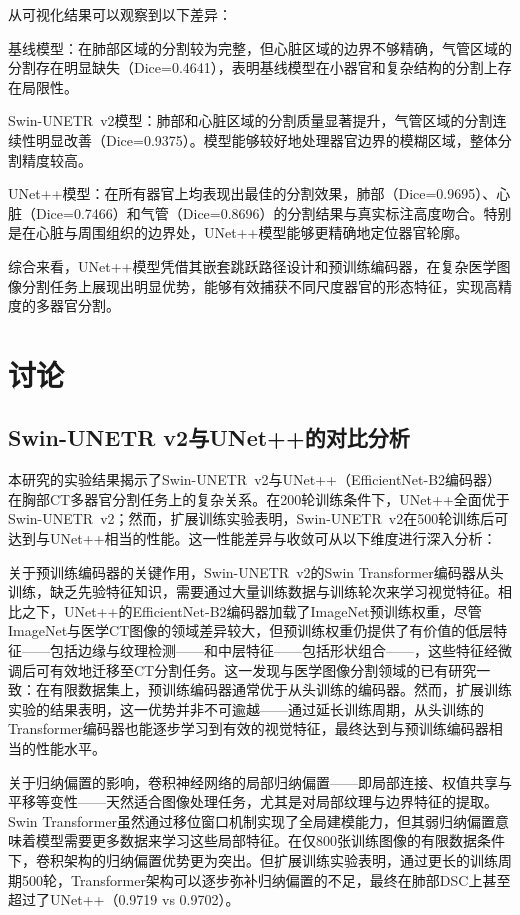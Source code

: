 \documentclass[12pt, a4paper]{article}
\begin{document}
从可视化结果可以观察到以下差异：

基线模型：在肺部区域的分割较为完整，但心脏区域的边界不够精确，气管区域的分割存在明显缺失（Dice=0.4641），表明基线模型在小器官和复杂结构的分割上存在局限性。

Swin-UNETR~v2模型：肺部和心脏区域的分割质量显著提升，气管区域的分割连续性明显改善（Dice=0.9375）。模型能够较好地处理器官边界的模糊区域，整体分割精度较高。

UNet++模型：在所有器官上均表现出最佳的分割效果，肺部（Dice=0.9695）、心脏（Dice=0.7466）和气管（Dice=0.8696）的分割结果与真实标注高度吻合。特别是在心脏与周围组织的边界处，UNet++模型能够更精确地定位器官轮廓。

综合来看，UNet++模型凭借其嵌套跳跃路径设计和预训练编码器，在复杂医学图像分割任务上展现出明显优势，能够有效捕获不同尺度器官的形态特征，实现高精度的多器官分割。

\section{讨论}
\label{sec:discussion}

\subsection{Swin-UNETR v2与UNet++的对比分析}

本研究的实验结果揭示了Swin-UNETR~v2与UNet++（EfficientNet-B2编码器）在胸部CT多器官分割任务上的复杂关系。在200轮训练条件下，UNet++全面优于Swin-UNETR~v2；然而，扩展训练实验表明，Swin-UNETR~v2在500轮训练后可达到与UNet++相当的性能。这一性能差异与收敛可从以下维度进行深入分析：

关于预训练编码器的关键作用，Swin-UNETR~v2的Swin Transformer编码器从头训练，缺乏先验特征知识，需要通过大量训练数据与训练轮次来学习视觉特征。相比之下，UNet++的EfficientNet-B2编码器加载了ImageNet预训练权重，尽管ImageNet与医学CT图像的领域差异较大，但预训练权重仍提供了有价值的低层特征——包括边缘与纹理检测——和中层特征——包括形状组合——，这些特征经微调后可有效地迁移至CT分割任务。这一发现与医学图像分割领域的已有研究一致：在有限数据集上，预训练编码器通常优于从头训练的编码器。然而，扩展训练实验的结果表明，这一优势并非不可逾越——通过延长训练周期，从头训练的Transformer编码器也能逐步学习到有效的视觉特征，最终达到与预训练编码器相当的性能水平。

关于归纳偏置的影响，卷积神经网络的局部归纳偏置——即局部连接、权值共享与平移等变性——天然适合图像处理任务，尤其是对局部纹理与边界特征的提取。Swin Transformer虽然通过移位窗口机制实现了全局建模能力，但其弱归纳偏置意味着模型需要更多数据来学习这些局部特征。在仅800张训练图像的有限数据条件下，卷积架构的归纳偏置优势更为突出。但扩展训练实验表明，通过更长的训练周期500轮，Transformer架构可以逐步弥补归纳偏置的不足，最终在肺部DSC上甚至超过了UNet++（0.9719 vs 0.9702）。
\end{document}
